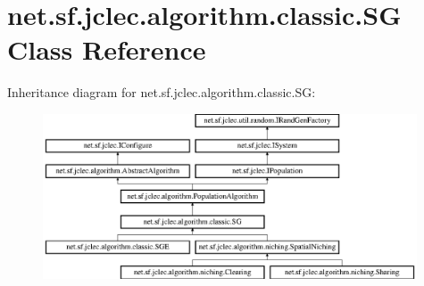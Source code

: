 \hypertarget{classnet_1_1sf_1_1jclec_1_1algorithm_1_1classic_1_1_s_g}{\section{net.\-sf.\-jclec.\-algorithm.\-classic.\-S\-G Class Reference}
\label{classnet_1_1sf_1_1jclec_1_1algorithm_1_1classic_1_1_s_g}
}
Inheritance diagram for net.\-sf.\-jclec.\-algorithm.\-classic.\-S\-G\-:\begin{figure}[H]
\begin{center}
\leavevmode
\includegraphics[height=4.893883cm]{classnet_1_1sf_1_1jclec_1_1algorithm_1_1classic_1_1_s_g}
\end{center}
\end{figure}
